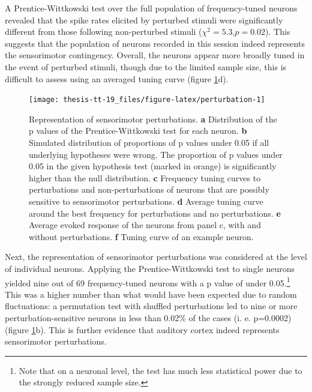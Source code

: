 \documentclass[]{report}
\let\rmarkdownfootnote\footnote%
\def\footnote{\protect\rmarkdownfootnote}
\theoremstyle{definition}
\theoremstyle{definition}
\theoremstyle{definition}
\theoremstyle{remark}
\begin{document}
A Prentice-Wittkowski test over the full population of frequency-tuned
neurons revealed that the spike rates elicited by perturbed stimuli were
significantly different from those following non-perturbed stimuli
(\(\chi^2=5.3\),\(p=0.02\)). This suggests that the population of
neurons recorded in this session indeed represents the sensorimotor
contingency. Overall, the neurons appear more broadly tuned in the event
of perturbed stimuli, though due to the limited sample size, this is
difficult to assess using an averaged tuning curve (figure
\ref{fig:perturbation}d).

\begin{figure}

{\centering \texttt{[image: thesis-tt-19\_files/figure-latex/perturbation-1]} 

}

\caption{Representation of sensorimotor perturbations.
\textbf{a} Distribution of the p values of the Prentice-Wittkowski test
for each neuron. \textbf{b} Simulated distribution of proportions of p
values under 0.05 if all underlying hypotheses were wrong. The
proportion of p values under 0.05 in the given hypothesis test (marked
in orange) is significantly higher than the null distribution.
\textbf{c} Frequency tuning curves to perturbations and
non-perturbations of neurons that are possibly sensitive to sensorimotor
perturbations. \textbf{d} Average tuning curve around the best frequency
for perturbations and no perturbations. \textbf{e} Average evoked
response of the neurons from panel c, with and without perturbations.
\textbf{f} Tuning curve of an example neuron.}\label{fig:perturbation}
\end{figure}














Next, the representation of sensorimotor perturbations was considered at
the level of individual neurons. Applying the Prentice-Wittkowski test
to single neurons yielded nine out of 69 frequency-tuned neurons with a
p value of under 0.05.\footnote{Note that on a neuronal level, the test
  has much less statistical power due to the strongly reduced sample
  size.} This was a higher number than what would have been expected due
to random fluctuations: a permutation test with shuffled perturbations
led to nine or more perturbation-sensitive neurons in less than 0.02\%
of the cases (i. e. p=0.0002) (figure \ref{fig:perturbation}b). This is
further evidence that auditory cortex indeed represents sensorimotor
perturbations.
\end{document}
